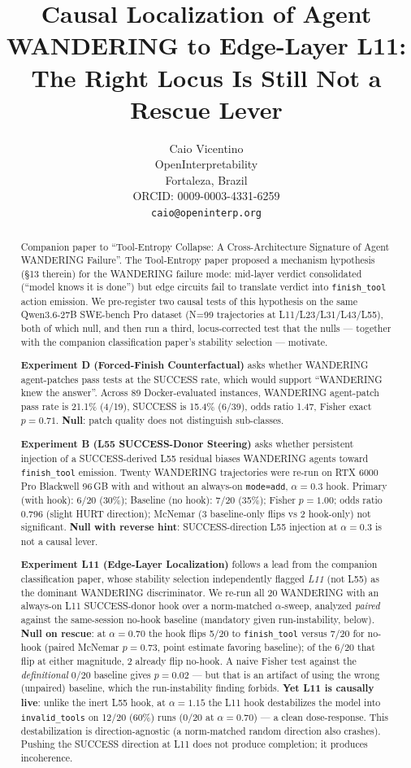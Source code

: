 \documentclass[11pt]{article}
\title{Causal Localization of Agent WANDERING to Edge-Layer L11: \\
The Right Locus Is Still Not a Rescue Lever}
\author{%
  Caio Vicentino \\
  OpenInterpretability \\
  Fortaleza, Brazil \\
  ORCID: 0009-0003-4331-6259 \\
  \texttt{caio@openinterp.org}%
}
\begin{document}
\maketitle

\begin{abstract}
Companion paper to ``Tool-Entropy Collapse: A Cross-Architecture Signature of Agent WANDERING Failure''. The Tool-Entropy paper proposed a mechanism hypothesis (\S13 therein) for the WANDERING failure mode: mid-layer verdict consolidated (``model knows it is done'') but edge circuits fail to translate verdict into \texttt{finish\_tool} action emission. We pre-register two causal tests of this hypothesis on the same Qwen3.6-27B SWE-bench Pro dataset (N=99 trajectories at L11/L23/L31/L43/L55), both of which null, and then run a third, locus-corrected test that the nulls --- together with the companion classification paper's stability selection --- motivate.

\textbf{Experiment D (Forced-Finish Counterfactual)} asks whether WANDERING agent-patches pass tests at the SUCCESS rate, which would support ``WANDERING knew the answer''. Across 89 Docker-evaluated instances, WANDERING agent-patch pass rate is 21.1\% (4/19), SUCCESS is 15.4\% (6/39), odds ratio 1.47, Fisher exact $p=0.71$. \textbf{Null}: patch quality does not distinguish sub-classes.

\textbf{Experiment B (L55 SUCCESS-Donor Steering)} asks whether persistent injection of a SUCCESS-derived L55 residual biases WANDERING agents toward \texttt{finish\_tool} emission. Twenty WANDERING trajectories were re-run on RTX 6000 Pro Blackwell 96\,GB with and without an always-on \texttt{mode=add}, $\alpha=0.3$ hook. Primary (with hook): 6/20 (30\%); Baseline (no hook): 7/20 (35\%); Fisher $p=1.00$; odds ratio 0.796 (slight HURT direction); McNemar (3 baseline-only flips vs 2 hook-only) not significant. \textbf{Null with reverse hint}: SUCCESS-direction L55 injection at $\alpha=0.3$ is not a causal lever.

\textbf{Experiment L11 (Edge-Layer Localization)} follows a lead from the companion classification paper, whose stability selection independently flagged \emph{L11} (not L55) as the dominant WANDERING discriminator. We re-run all 20 WANDERING with an always-on L11 SUCCESS-donor hook over a norm-matched $\alpha$-sweep, analyzed \emph{paired} against the same-session no-hook baseline (mandatory given run-instability, below). \textbf{Null on rescue}: at $\alpha=0.70$ the hook flips 5/20 to \texttt{finish\_tool} versus 7/20 for no-hook (paired McNemar $p=0.73$, point estimate favoring baseline); of the 6/20 that flip at either magnitude, 2 already flip no-hook. A naive Fisher test against the \emph{definitional} 0/20 baseline gives $p=0.02$ --- but that is an artifact of using the wrong (unpaired) baseline, which the run-instability finding forbids. \textbf{Yet L11 is causally live}: unlike the inert L55 hook, at $\alpha=1.15$ the L11 hook destabilizes the model into \texttt{invalid\_tools} on 12/20 (60\%) runs (0/20 at $\alpha=0.70$) --- a clean dose-response. This destabilization is direction-agnostic (a norm-matched random direction also crashes). Pushing the SUCCESS direction at L11 does not produce completion; it produces incoherence.


\end{abstract}
\end{document}
